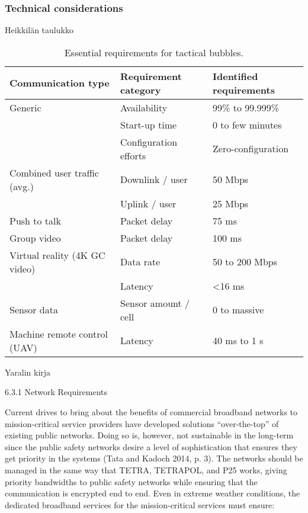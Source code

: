 \documentclass[english, 12pt, a4paper, elec, utf8, a-1b, online]{aaltothesis}
\begin{document}
\subsubsection{Technical considerations}

Heikkilän taulukko

\begin{table}[]
  \centering
  \caption{Essential requirements for tactical bubbles.}
  \begin{tabular}{@{}lll@{}}
  \toprule
  Communication type            & Requirement category  & Identified requirements \\ \midrule
  Generic                       & Availability          & 99\% to 99.999\%        \\
                                & Start-up time         & 0 to few minutes        \\
                                & Configuration efforts & Zero-configuration      \\
  Combined user traffic (avg.)  & Downlink / user       & 50 Mbps                 \\
                                & Uplink / user         & 25 Mbps                 \\
  Push to talk                  & Packet delay          & 75 ms                   \\
  Group video                   & Packet delay          & 100 ms                  \\
  Virtual reality (4K GC video) & Data rate             & 50 to 200 Mbps          \\
                                & Latency               & \textless 16 ms         \\
  Sensor data                   & Sensor amount / cell  & 0 to massive            \\
  Machine remote control (UAV)  & Latency               & 40 ms to 1 s            \\ \bottomrule
  \end{tabular}
  \label{table-mcx-requirements}
\end{table}

Yaralin kirja

6.3.1 Network Requirements

Current drives to bring about the benefits of commercial broadband networks to mission-critical service providers have developed solutions “over-the-top” of existing public networks.
Doing so is, however, not sustainable in the long-term since the public safety networks desire a level of sophistication that ensures they get priority in the systems (Tata and Kadoch 2014, p.
3).
The networks should be managed in the same way that TETRA, TETRAPOL, and P25 works, giving priority bandwidths to public safety networks while ensuring that the communication is encrypted end to end.
Even in extreme weather conditions, the dedicated broadband services for the mission-critical services must ensure:
\end{document}

